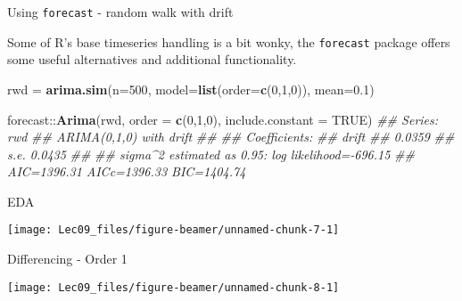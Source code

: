 \documentclass[11pt,ignorenonframetext,]{beamer}
\newenvironment{Shaded}{}{}
\newcommand{\CommentTok}[1]{\textcolor[rgb]{0.38,0.63,0.69}{\textit{#1}}}
\newcommand{\DataTypeTok}[1]{\textcolor[rgb]{0.56,0.13,0.00}{#1}}
\newcommand{\DecValTok}[1]{\textcolor[rgb]{0.25,0.63,0.44}{#1}}
\newcommand{\FloatTok}[1]{\textcolor[rgb]{0.25,0.63,0.44}{#1}}
\newcommand{\KeywordTok}[1]{\textcolor[rgb]{0.00,0.44,0.13}{\textbf{#1}}}
\newcommand{\NormalTok}[1]{#1}
\newcommand{\OperatorTok}[1]{\textcolor[rgb]{0.40,0.40,0.40}{#1}}
\newcommand{\OtherTok}[1]{\textcolor[rgb]{0.00,0.44,0.13}{#1}}
\newcommand{\StringTok}[1]{\textcolor[rgb]{0.25,0.44,0.63}{#1}}
\let\oldShaded\Shaded
\let\endoldShaded\endShaded
\renewenvironment{Shaded}{\footnotesize\begin{spacing}{0.9}\oldShaded}{\endoldShaded\end{spacing}}
\begin{document}
\begin{frame}[fragile,t]{Using \texttt{forecast} - random walk with
drift}
\protect\hypertarget{using-forecast---random-walk-with-drift}{}

Some of R's base timeseries handling is a bit wonky, the
\texttt{forecast} package offers some useful alternatives and additional
functionality.

\begin{Shaded}
\begin{Highlighting}[]
\NormalTok{rwd =}\StringTok{ }\KeywordTok{arima.sim}\NormalTok{(}\DataTypeTok{n=}\DecValTok{500}\NormalTok{, }\DataTypeTok{model=}\KeywordTok{list}\NormalTok{(}\DataTypeTok{order=}\KeywordTok{c}\NormalTok{(}\DecValTok{0}\NormalTok{,}\DecValTok{1}\NormalTok{,}\DecValTok{0}\NormalTok{)), }\DataTypeTok{mean=}\FloatTok{0.1}\NormalTok{) }

\NormalTok{forecast}\OperatorTok{::}\KeywordTok{Arima}\NormalTok{(rwd, }\DataTypeTok{order =} \KeywordTok{c}\NormalTok{(}\DecValTok{0}\NormalTok{,}\DecValTok{1}\NormalTok{,}\DecValTok{0}\NormalTok{), }\DataTypeTok{include.constant =} \OtherTok{TRUE}\NormalTok{)}
\CommentTok{## Series: rwd }
\CommentTok{## ARIMA(0,1,0) with drift }
\CommentTok{## }
\CommentTok{## Coefficients:}
\CommentTok{##        drift}
\CommentTok{##       0.0359}
\CommentTok{## s.e.  0.0435}
\CommentTok{## }
\CommentTok{## sigma^2 estimated as 0.95:  log likelihood=-696.15}
\CommentTok{## AIC=1396.31   AICc=1396.33   BIC=1404.74}
\end{Highlighting}
\end{Shaded}

\end{frame}

\begin{frame}{EDA}
\protect\hypertarget{eda}{}

\begin{center}\texttt{[image: Lec09\_files/figure-beamer/unnamed-chunk-7-1]} \end{center}

\end{frame}

\begin{frame}{Differencing - Order 1}
\protect\hypertarget{differencing---order-1}{}

\begin{center}\texttt{[image: Lec09\_files/figure-beamer/unnamed-chunk-8-1]} \end{center}

\end{frame}
\end{document}
